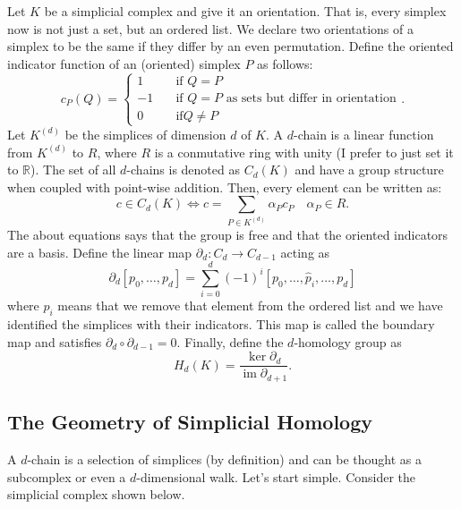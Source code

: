 \documentclass{article}
\newcommand{\R}{\mathbb R}
\DeclareMathOperator{\im}{im}
\begin{document}
Let \(K\) be a simplicial complex and give it an orientation. That is, every
simplex now is not just a set, but an ordered list. We declare two orientations
of a simplex to be the same if they differ by an even permutation. Define the
oriented indicator function of an (oriented) simplex \(P\) as follows:
\begin{displaymath}
  c_P(Q) =
  \left\{
  \begin{aligned}
    1 &\quad \textrm{if } Q=P\\
    -1 &\quad \textrm{if } Q=P\text{ as sets but differ in orientation}\\
    0 &\quad \textrm{if} Q\ne P
  \end{aligned}.
  \right.
\end{displaymath}
Let \(K^{(d)}\) be the simplices of dimension \(d\) of \(K\). A \(d\)-chain is
a linear function from \(K^{(d)}\) to \(R\), where \(R\) is a conmutative ring with unity
(I prefer to just set it to \(\R\)).
The set of all \(d\)-chains is denoted as \(C_d(K)\) and have a group structure
when coupled with point-wise addition. Then, every element can be written as:
\begin{displaymath}
  c\in C_d(K) \iff c = \sum_{P\in K^{(d)}} \alpha_P c_P
  \quad \alpha_P\in R.
\end{displaymath}
The about equations says that the group is free and that the oriented indicators are a basis.
Define the linear map \(\partial_d\colon C_d \to C_{d-1}\) acting as
\begin{displaymath}
  \partial_d [p_0, \ldots, p_d] = \sum_{i=0}^{d} (-1)^{i} [p_0, \ldots, \hat p_i, \ldots, p_d]
\end{displaymath}
where \(\hat p_i\) means that we remove that element from the ordered list and we have identified
the simplices with their indicators.
This map is called the boundary map and satisfies \(\partial_{d} \circ
\partial_{d-1} = 0\). Finally, define the \(d\)-homology group as
\begin{displaymath}
  H_d(K) = \frac{\ker \partial_{d}}{\im \partial_{d+1}}.
\end{displaymath}

\subsection{The Geometry of Simplicial Homology}

A \(d\)-chain is a selection of simplices (by definition) and can be thought as a 
subcomplex or even a \(d\)-dimensional walk. Let's start simple. Consider the simplicial
complex shown below.
\end{document}
